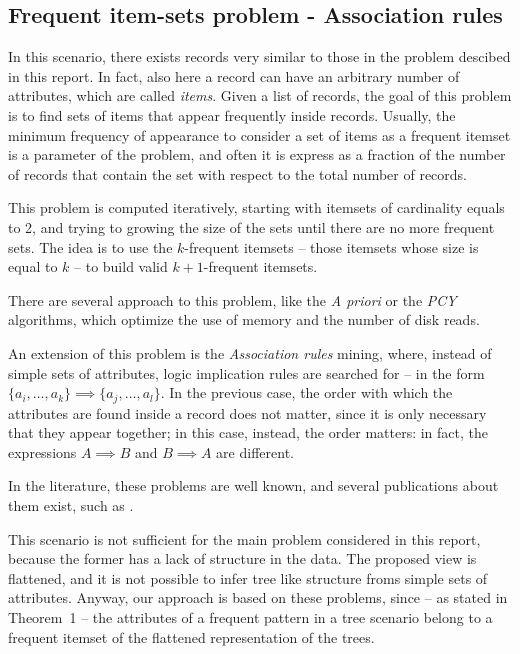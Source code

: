\documentclass{acm_proc_article-sp-sigmod09}
\begin{document}
\subsection{Frequent item-sets problem - Association rules}
\label{sec:freqitemset}
In this scenario, there exists records very similar to those in the problem descibed in this report. In fact, also here a record can have an arbitrary number of attributes, which are called \emph{items}. Given a list of records, the goal of this problem is to find sets of items that appear frequently inside records. Usually, the minimum frequency of appearance to consider a set of items as a frequent itemset is a parameter of the problem, and often it is express as a fraction of the number of records that contain the set with respect to the total number of records.

This problem is computed iteratively, starting with itemsets of cardinality equals to 2, and trying to growing the size of the sets until there are no more frequent sets. The idea is to use the $k$-frequent itemsets -- those itemsets whose size is equal to $k$ -- to build valid $k + 1$-frequent itemsets.

There are several approach to this problem, like the \emph{A priori} or the \emph{PCY} algorithms, which optimize the use of memory and the number of disk reads.

An extension of this problem is the \emph{Association rules} mining, where, instead of simple sets of attributes, logic implication rules are searched for -- in the form $\{a_i, \dotsc, a_k\} \implies \{a_j, \dotsc, a_l\}$. In the previous case, the order with which the attributes are found inside a record does not matter, since it is only necessary that they appear together; in this case, instead, the order matters: in fact, the expressions $A \implies B$ and $B \implies A$ are different.

In the literature, these problems are well known, and several publications about them exist, such as \cite{agrawal1994fast, ivancsy2006time, rakesh1993mining, brin1997dynamic}.

This scenario is not sufficient for the main problem considered in this report, because the former has a lack of structure in the data. The proposed view is flattened, and it is not possible to infer tree like structure froms simple sets of attributes. Anyway, our approach is based on these problems, since -- as stated in Theorem~1 -- the attributes of a frequent pattern in a tree scenario belong to a frequent itemset of the flattened representation of the trees.
\end{document}
